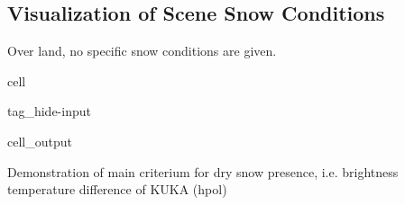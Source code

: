 \documentclass[letterpaper,10pt,english]{jupyterBook}
\begin{document}
\subsection{Visualization of Scene Snow Conditions}
\label{\detokenize{algorithm/CIMR_L2_TSA_SCEPS:visualization-of-scene-snow-conditions}}
\sphinxAtStartPar
Over land, no specific snow conditions are given.

\begin{sphinxuseclass}{cell}
\begin{sphinxuseclass}{tag_hide-input}\begin{sphinxVerbatimOutput}

\begin{sphinxuseclass}{cell_output}
\noindent{}

\end{sphinxuseclass}\end{sphinxVerbatimOutput}

\end{sphinxuseclass}
\end{sphinxuseclass}
\sphinxAtStartPar
Demonstration of main criterium for dry snow presence, i.e. brightness temperature difference of KU\sphinxhyphen{}KA (h\sphinxhyphen{}pol)
\end{document}

